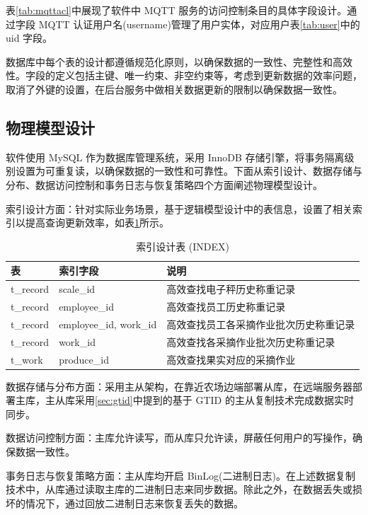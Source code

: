 表\ref{tab:mqttacl}中展现了软件中 MQTT 服务的访问控制条目的具体字段设计。通过字段 MQTT 认证用户名(username)管理了用户实体，对应用户表\ref{tab:user}中的 uid 字段。

数据库中每个表的设计都遵循规范化原则，以确保数据的一致性、完整性和高效性。字段的定义包括主键、唯一约束、非空约束等，考虑到更新数据的效率问题，取消了外键的设置，在后台服务中做相关数据更新的限制以确保数据一致性。

\subsection{物理模型设计}

软件使用 MySQL 作为数据库管理系统，采用 InnoDB 存储引擎，将事务隔离级别设置为可重复读，以确保数据的一致性和可靠性。下面从索引设计、数据存储与分布、数据访问控制和事务日志与恢复策略四个方面阐述物理模型设计。

索引设计方面：针对实际业务场景，基于逻辑模型设计中的表信息，设置了相关索引以提高查询更新效率，如表\ref{tab:index}所示。

\begin{table}[H]
\centering
\caption{索引设计表 (INDEX)}
\label{tab:index}
\begin{tabular}{|l|l|l|}
\hline
表 & 索引字段 & 说明 \\ \hline

t\_record & scale\_id & 高效查找电子秤历史称重记录 \\ \hline

t\_record & employee\_id & 高效查找员工历史称重记录 \\ \hline

t\_record & employee\_id, work\_id & 高效查找员工各采摘作业批次历史称重记录 \\ \hline

t\_record & work\_id & 高效查找各采摘作业批次历史称重记录 \\ \hline

t\_work & produce\_id & 高效查找果实对应的采摘作业 \\ \hline
\end{tabular}
\end{table}

数据存储与分布方面：采用主从架构，在靠近农场边端部署从库，在远端服务器部署主库，主从库采用\ref{sec:gtid}中提到的基于 GTID 的主从复制技术完成数据实时同步。

数据访问控制方面：主库允许读写，而从库只允许读，屏蔽任何用户的写操作，确保数据一致性。

事务日志与恢复策略方面：主从库均开启 BinLog(二进制日志)。在上述数据复制技术中，从库通过读取主库的二进制日志来同步数据。除此之外，在数据丢失或损坏的情况下，通过回放二进制日志来恢复丢失的数据。

